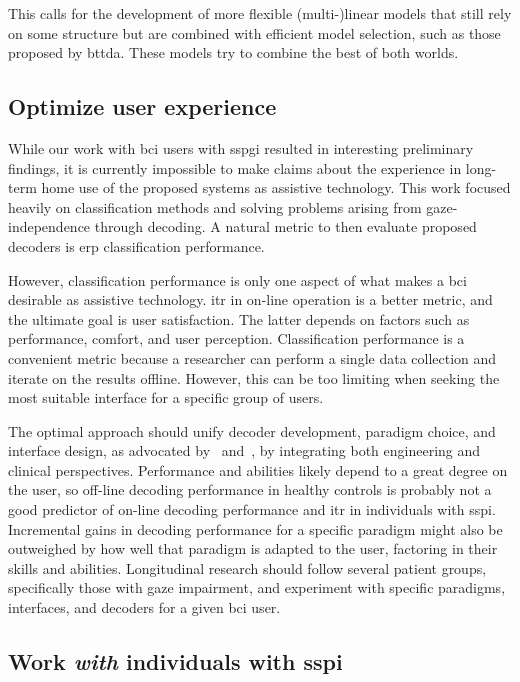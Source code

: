 This calls for the development of more flexible (multi-)linear models that still rely on some
structure but are combined with efficient model
selection, such as those proposed by \ac{bttda}.
These models try to combine the best of both worlds.

\subsection{Optimize user experience}
While our work with \ac{bci} users with \ac{sspgi} resulted in interesting
preliminary findings, it is currently impossible to make claims about the experience in long-term
home use of the proposed systems as assistive technology.
This work focused heavily on classification methods and solving problems
arising from gaze-independence through decoding.
A natural metric to then evaluate proposed decoders is \ac{erp} classification
performance.

However, classification performance is only one aspect of what makes a \ac{bci}
desirable as assistive technology.
\Ac{itr} in on-line operation is a better metric, and the ultimate goal
is user satisfaction.
The latter depends on factors such as performance, comfort, and user perception.
Classification performance is a convenient metric because a researcher can perform a single
data collection and iterate on the results offline.
However, this can be too limiting when seeking the most suitable interface
for a specific group of users.

The optimal approach should unify decoder development, paradigm choice, and interface
design, as advocated by~\textcite{Pan2022} and~\textcite{Fouad2020}, by integrating both
engineering and clinical perspectives.
Performance and abilities likely depend to a great degree on the user,
so off-line decoding performance in healthy controls is probably not a good
predictor of on-line decoding performance and \ac{itr} in individuals with
\ac{sspi}.
Incremental gains in decoding performance for a specific paradigm might
also be outweighed by how well that paradigm is adapted to the user, factoring in
their skills and abilities.
Longitudinal research should follow several patient groups, specifically those with gaze
impairment, and experiment with specific paradigms, interfaces, and decoders for
a given \ac{bci} user.


\subsection{Work \emph{with} individuals with \acs{sspi}}

